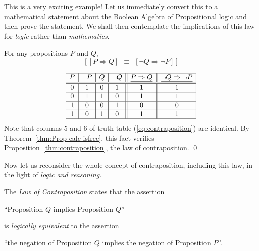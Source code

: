 \smallskip

\noindent
This is a very exciting example!  Let us immediately convert this to a mathematical statement about the Boolean Algebra of Propositional logic and then prove the statement.  We shall then contemplate the implications of this law for {\em logic} rather than {\em mathematics}.

\begin{prop}
\label{thm:contraposition}
For any propositions $P$ and $Q$,
\[  \left[ [ P \Rightarrow Q ] \ \ \equiv \ \ [ \neg Q
    \Rightarrow \neg P ] \right]
\]
\end{prop}

\begin{equation}
\label{eq:contraposition}
\begin{array}{|c|c|c|c||c||c|}
\hline
P & \neg P & Q & \neg Q & \underline{P \Rightarrow Q}
 & \underline{\neg Q \Rightarrow \neg P} \\
\hline
\hline
0 & 1 & 0 & 1 & 1 & 1 \\
\hline
0 & 1 & 1 & 0 & 1 & 1 \\
\hline
1 & 0 & 0 & 1 & 0 & 0 \\
\hline
1 & 0 & 1 & 0 & 1 & 1 \\
\hline
\end{array}
\end{equation}
Note that columns 5 and 6 of truth table (\ref{eq:contraposition}) are identical.  By Theorem~\ref{thm:Prop-calc-isfree}, this fact verifies Proposition~\ref{thm:contraposition}, the law of contraposition.  \qed

\smallskip

Now let us reconsider the whole concept of contraposition, including this law, in the light of {\em logic and reasoning}.

\medskip

The {\it Law of Contraposition} states that the assertion

\smallskip

\hspace*{.35in}
``Proposition $Q$ implies Proposition $Q$''

\smallskip

\noindent
is {\em logically equivalent} to the assertion

\smallskip

\hspace*{.35in}
``the negation of Proposition $Q$ implies the negation of Proposition $P$''.

